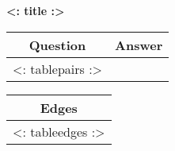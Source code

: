 \usepackage{longtable}


\begin{center}
  \textbf{<: title :>}

  \bigskip

  \begin{longtable}{|c|c|}
    \hline
    \textbf{Question}&\textbf{Answer}\\\hline\endhead
    <: tablepairs :>
  \end{longtable}

  \bigskip

  \begin{longtable}{|c|}
    \hline
    \textbf{Edges}\\\hline\endhead
    <: tableedges :>
  \end{longtable}
\end{center}



